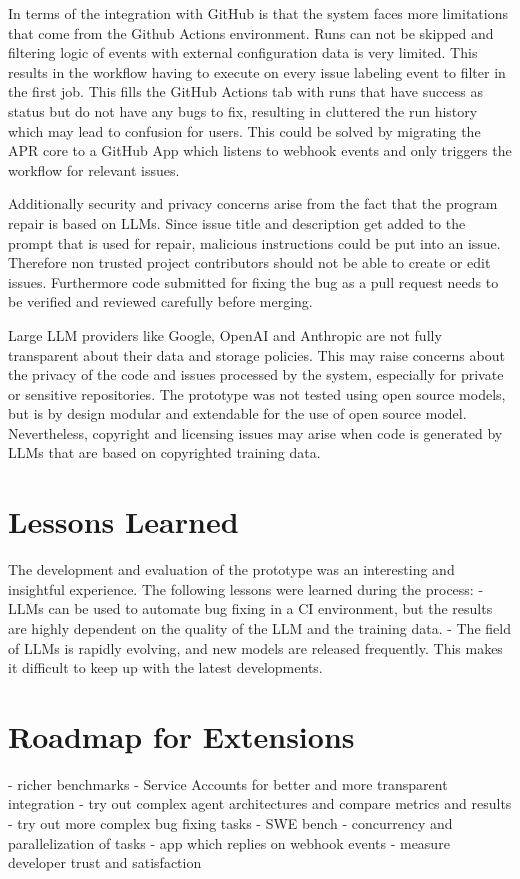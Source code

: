 In terms of the integration with GitHub is that the system faces more limitations that come from the Github Actions environment. Runs can not be skipped and filtering logic of events with external configuration data is very limited. This results in the workflow having to execute on every issue labeling event to filter in the first job. This fills the GitHub Actions tab with runs that have success as status but do not have any bugs to fix, resulting in cluttered the run history which may lead to confusion for users. This could be solved by migrating the APR core to a GitHub App which listens to webhook events and only triggers the workflow for relevant issues.

Additionally security and privacy concerns arise from the fact that the program repair is based on LLMs. Since issue title and description get added to the prompt that is used for repair, malicious instructions could be put into an issue. Therefore non trusted project contributors should not be able to create or edit issues. Furthermore code submitted for fixing the bug as a pull request needs to be verified and reviewed carefully before merging.

Large LLM providers like Google, OpenAI and Anthropic are not fully transparent about their data and storage policies. This may raise concerns about the privacy of the code and issues processed by the system, especially for private or sensitive repositories. The prototype was not tested using open source models, but is by design modular and  extendable for the use of open source model. Nevertheless, copyright and licensing issues may arise when code is generated by LLMs that are based on copyrighted training data. \cite{sauvolaFutureSoftwareDevelopment2024, houLargeLanguageModels2024}


\section{Lessons Learned}
The development and evaluation of the prototype was an interesting and insightful experience. The following lessons were learned during the process:
- LLMs can be used to automate bug fixing in a CI environment, but the results are highly dependent on the quality of the LLM and the training data.
- The field of LLMs is rapidly evolving, and new models are released frequently. This makes it difficult to keep up with the latest developments.


\section{Roadmap for Extensions} \label{section:roadmap}
- richer benchmarks
- Service Accounts for better and more transparent integration
- try out complex agent architectures and compare metrics and results
- try out more complex bug fixing tasks - SWE bench
- concurrency and parallelization of tasks
- app which replies on webhook events
- measure developer trust and satisfaction